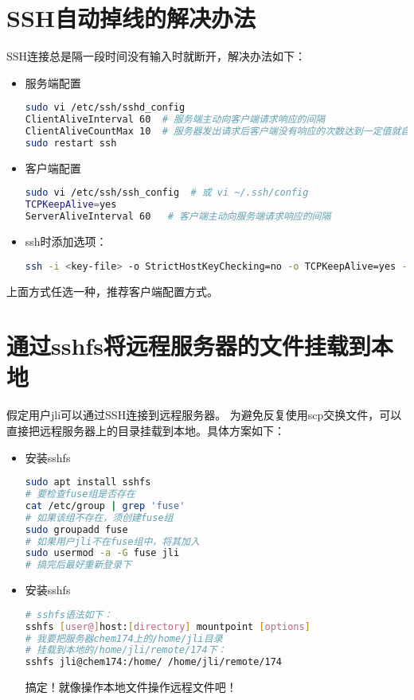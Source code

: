 \section{SSH自动掉线的解决办法}
SSH连接总是隔一段时间没有输入时就断开，解决办法如下：
\begin{itemize}
\item 服务端配置
\begin{lstlisting}[language=bash]
sudo vi /etc/ssh/sshd_config
ClientAliveInterval 60  # 服务端主动向客户端请求响应的间隔
ClientAliveCountMax 10  # 服务器发出请求后客户端没有响应的次数达到一定值就自动断开
sudo restart ssh
\end{lstlisting}

\item 客户端配置
\begin{lstlisting}[language=bash]
sudo vi /etc/ssh/ssh_config  # 或 vi ~/.ssh/config
TCPKeepAlive=yes
ServerAliveInterval 60   # 客户端主动向服务端请求响应的间隔
\end{lstlisting}

\item ssh时添加选项：
\begin{lstlisting}[language=bash]
ssh -i <key-file> -o StrictHostKeyChecking=no -o TCPKeepAlive=yes -o ServerAliveInterval=30 ubuntu@<ip>
\end{lstlisting}
\end{itemize}
上面方式任选一种，推荐客户端配置方式。


\section{通过sshfs将远程服务器的文件挂载到本地}
假定用户jli可以通过SSH连接到远程服务器。
为避免反复使用scp交换文件，可以直接把远程服务器上的目录挂载到本地。具体方案如下：
\begin{itemize}
\item 安装sshfs
\begin{lstlisting}[language=bash]
sudo apt install sshfs
# 要检查fuse组是否存在
cat /etc/group | grep 'fuse'
# 如果该组不存在，须创建fuse组
sudo groupadd fuse
# 如果用户jli不在fuse组中，将其加入
sudo usermod -a -G fuse jli
# 搞完后最好重新登录下
\end{lstlisting}

\item 安装sshfs
\begin{lstlisting}[language=bash]
# sshfs语法如下：
sshfs [user@]host:[directory] mountpoint [options]
# 我要把服务器chem174上的/home/jli目录
# 挂载到本地的/home/jli/remote/174下：
sshfs jli@chem174:/home/ /home/jli/remote/174
\end{lstlisting}
搞定！就像操作本地文件操作远程文件吧！
\end{itemize}

